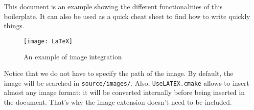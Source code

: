 \documentclass[a4paper,english,french]{article}
\begin{document}
This document is an example showing the different functionalities of this boilerplate. It can also be used as a quick cheat sheet to find how to write quickly things.

\begin{figure}
    \centering
    \texttt{[image: LaTeX]}
    \caption{An example of image integration}
\end{figure}

Notice that we do not have to specify the path of the image. By default, the image will be searched in \texttt{source/images/}. Also, \texttt{UseLATEX.cmake} allows to insert almost any image format: it will be converted internally before being inserted in the document. That's why the image extension doesn't need to be included.


\end{document}
